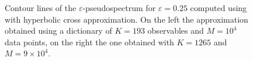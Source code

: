 \begin{figure}[h]
    \caption{Contour lines of the $\varepsilon$-pseudospectrum for $\varepsilon = 0.25$ computed using  with hyperbolic cross approximation. On the left the approximation obtained using a dictionary of $K=193$ observables and $M = 10^4$ data points, on the right the one obtained with $K=1265$ and $M = 9 \times 10^4$.}
    \label{pendulum_pseudospectrum}
\end{figure}

